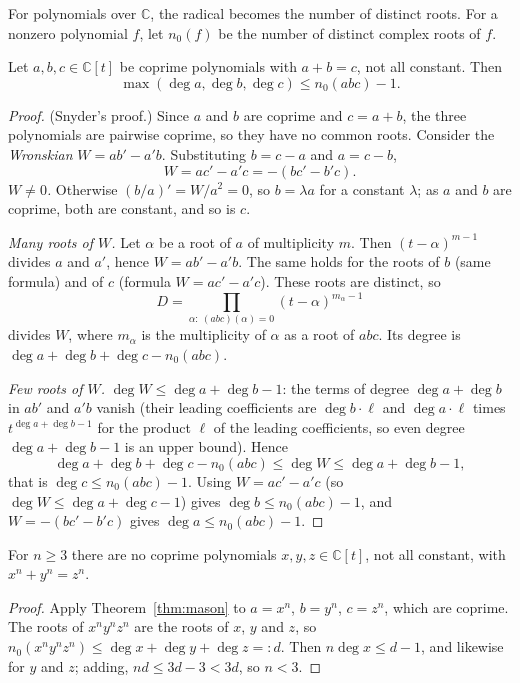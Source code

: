 For polynomials over $\mathbb C$, the radical becomes the number of distinct roots. For a nonzero polynomial $f$, let $n_0(f)$ be the number of distinct
complex roots of $f$.

\begin{theorem}\label{thm:mason}
Let $a,b,c\in\mathbb C[t]$ be coprime polynomials with $a+b=c$, not all constant. Then
\[
\max(\deg a,\deg b,\deg c)\le n_0(abc)-1.
\]
\end{theorem}
\begin{proof}
(Snyder's proof.) Since $a$ and $b$ are coprime and $c=a+b$, the three polynomials are pairwise coprime, so they have no common roots. Consider the
\emph{Wronskian} $W=ab'-a'b$. Substituting $b=c-a$ and $a=c-b$,
\[
W=ac'-a'c=-(bc'-b'c).
\]
\emph{$W\ne0$.} Otherwise $(b/a)'=W/a^2=0$, so $b=\lambda a$ for a constant $\lambda$; as $a$ and $b$ are coprime, both are constant, and so is $c$.

\emph{Many roots of $W$.} Let $\alpha$ be a root of $a$ of multiplicity $m$. Then $(t-\alpha)^{m-1}$ divides $a$ and $a'$, hence $W=ab'-a'b$. The same holds for
the roots of $b$ (same formula) and of $c$ (formula $W=ac'-a'c$). These roots are distinct, so
\[
D=\prod_{\alpha:\ (abc)(\alpha)=0}(t-\alpha)^{m_\alpha-1}
\]
divides $W$, where $m_\alpha$ is the multiplicity of $\alpha$ as a root of $abc$. Its degree is $\deg a+\deg b+\deg c-n_0(abc)$.

\emph{Few roots of $W$.} $\deg W\le\deg a+\deg b-1$: the terms of degree $\deg a+\deg b$ in $ab'$ and $a'b$ vanish (their leading coefficients are
$\deg b\cdot\ell$ and $\deg a\cdot\ell$ times $t^{\deg a+\deg b-1}$ for the product $\ell$ of the leading coefficients, so even degree $\deg a+\deg b-1$ is
an upper bound). Hence
\[
\deg a+\deg b+\deg c-n_0(abc)\le\deg W\le\deg a+\deg b-1,
\]
that is $\deg c\le n_0(abc)-1$. Using $W=ac'-a'c$ (so $\deg W\le\deg a+\deg c-1$) gives $\deg b\le n_0(abc)-1$, and $W=-(bc'-b'c)$ gives
$\deg a\le n_0(abc)-1$.
\end{proof}

\begin{corollary}\label{cor:fermatpoly}
For $n\ge3$ there are no coprime polynomials $x,y,z\in\mathbb C[t]$, not all constant, with $x^n+y^n=z^n$.
\end{corollary}
\begin{proof}
Apply Theorem~\ref{thm:mason} to $a=x^n$, $b=y^n$, $c=z^n$, which are coprime. The roots of $x^ny^nz^n$ are the roots of $x$, $y$ and $z$, so
$n_0(x^ny^nz^n)\le\deg x+\deg y+\deg z=:d$. Then $n\deg x\le d-1$, and likewise for $y$ and $z$; adding, $nd\le3d-3<3d$, so $n<3$.
\end{proof}

